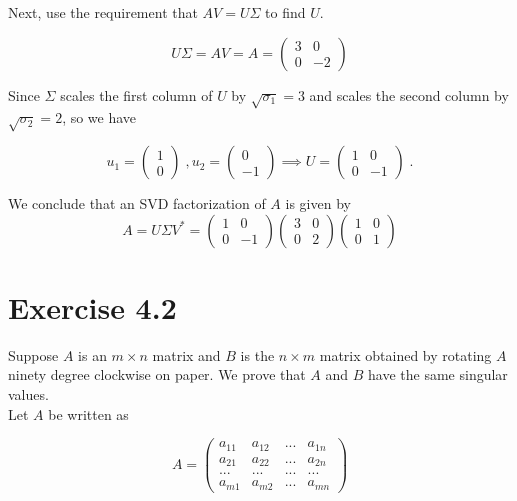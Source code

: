 \documentclass[11pt]{article}
\begin{document}
Next, use the requirement that $AV = U\Sigma$ to find $U$.

$$U\Sigma = AV = A = \begin{pmatrix}
3 &0 \\ 0 &-2 \end{pmatrix}$$

Since $\Sigma$ scales the first column of $U$ by $\sqrt{\sigma_1} = 3$ and scales the second column by $\sqrt{\sigma_2} = 2$, so we have

$$u_1 = \begin{pmatrix} 1 \\ 0 \end{pmatrix} \;, u_2 = \begin{pmatrix}
0 \\ -1 \end{pmatrix} \implies U  = \begin{pmatrix}
1 & 0 \\ 0 & -1 \end{pmatrix} \;.$$

We conclude that an SVD factorization of $A$ is given by
$$A = U\Sigma V^* = \begin{pmatrix}
1 & 0 \\ 0 & -1 \end{pmatrix} \begin{pmatrix}
3 & 0 \\ 0 & 2 \end{pmatrix} \begin{pmatrix}
1 & 0 \\ 0 & 1 \end{pmatrix}$$

\section*{Exercise 4.2}

Suppose $A$ is an $m\times n$ matrix and $B$ is the $n\times m$ matrix obtained by rotating $A$ ninety degree clockwise on paper. We prove that $A$ and $B$ have the same singular values. \\

Let $A$ be written as

$$A = \begin{pmatrix}
a_{11} & a_{12} & ... & a_{1n} \\
a_{21} & a_{22} & ... & a_{2n} \\
... & ... & ... & ... \\
a_{m1} & a_{m2} & ... & a_{mn} \end{pmatrix}$$
\end{document}
